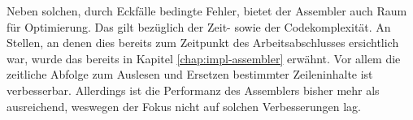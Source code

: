 Neben solchen, durch Eckfälle bedingte Fehler, bietet der Assembler auch Raum für Optimierung. Das gilt bezüglich der Zeit- sowie der Codekomplexität. An Stellen, an denen dies bereits zum Zeitpunkt des Arbeitsabschlusses ersichtlich war, wurde das bereits in Kapitel \ref{chap:impl-assembler} erwähnt. Vor allem die zeitliche Abfolge zum Auslesen und Ersetzen bestimmter Zeileninhalte ist verbesserbar. Allerdings ist die Performanz des Assemblers bisher mehr als ausreichend, weswegen der Fokus nicht auf solchen Verbesserungen lag.
